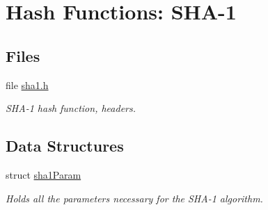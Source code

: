 \hypertarget{group__HASH__sha1__m}{
\section{Hash Functions: SHA-1}
\label{group__HASH__sha1__m}
}
\subsection*{Files}
\begin{CompactItemize}
\item 
file \hyperlink{sha1_8h}{sha1.h}
\begin{CompactList}\small\item\em SHA-1 hash function, headers. \item\end{CompactList}

\end{CompactItemize}
\subsection*{Data Structures}
\begin{CompactItemize}
\item 
struct \hyperlink{structsha1Param}{sha1Param}
\begin{CompactList}\small\item\em Holds all the parameters necessary for the SHA-1 algorithm. \item\end{CompactList}\end{CompactItemize}

